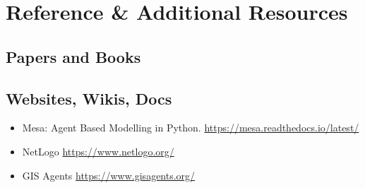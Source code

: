 \documentclass[a4paper,11pt]{article}
\newcommand{\sectiontitle}[1]{\section*{#1}}
\newcommand{\subsectiontitle}[1]{\subsection*{#1}}
\begin{document}
\newpage


\sectiontitle{Reference \& Additional Resources}

\subsectiontitle{Papers and Books}
\setlength{\bibitemsep}{3pt}
\setlength{\bibparsep}{3pt}
\printbibliography[title={},heading=none]

\subsectiontitle{Websites, Wikis, Docs}

\begin{itemize}
\item Mesa: Agent Based Modelling in Python. \href{https://mesa.readthedocs.io/latest/}{https://mesa.readthedocs.io/latest/}
\item NetLogo \href{https://www.netlogo.org/}{https://www.netlogo.org/}
\item GIS Agents \href{https://www.gisagents.org/}{https://www.gisagents.org/}
\end{itemize}
\end{document}
